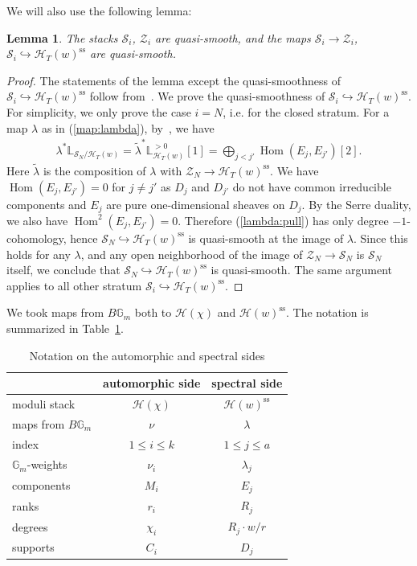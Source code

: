 \documentclass[11pt,oneside,a4paper,mathscr]{amsart}
\newtheorem{lemma}[thm]{Lemma}
\theoremstyle{definition}
\renewcommand{\leq}{\leqslant}
\newcommand{\cS}{\mathcal{S}}
\newcommand{\cH}{\mathcal{H}}
\newcommand{\bgm}{B\mathbb{G}_m}
\newcommand{\Hom}{\operatorname{Hom}}
\begin{document}
We will also use the following lemma: 
\begin{lemma}\label{lem:SZqsm}
    The stacks $\cS_i$, $\mathcal{Z}_i$ are quasi-smooth, 
    and the maps $\cS_i \to \mathcal{Z}_i$, $\cS_i \hookrightarrow \cH_T(w)^{\mathrm{ss}}$ are quasi-smooth. 
\end{lemma}
\begin{proof}
    The statements of the lemma except the quasi-smoothness of $\cS_i \hookrightarrow \cH_T(w)^{\mathrm{ss}}$ follow from~\cite[Lemma~3.1.4]{HalpK32}.
    We prove the quasi-smoothness of $\cS_i \hookrightarrow \cH_T(w)^{\mathrm{ss}}$. For simplicity, we only prove the case $i=N$, i.e. for the closed stratum. 
    For a map $\lambda$ as in (\ref{map:lambda}), by~\cite[Lemma~1.3.2]{HalpK32}, we have 
    \begin{align}\label{lambda:pull}
        \lambda^* \mathbb{L}_{\cS_N/\cH_T(w)}=\widetilde{\lambda}^* \mathbb{L}_{\cH_T(w)}^{>0}[1]=  \bigoplus_{j<j'}\Hom(E_j, E_{j'})[2].
    \end{align}
    Here $\widetilde{\lambda}$ is the composition of $\lambda$ with 
    $\mathcal{Z}_N \to \cH_T(w)^{\mathrm{ss}}$. 
   We have $\Hom(E_j, E_{j'})=0$ for $j\neq j'$
   as $D_j$ and $D_{j'}$ do not have common 
   irreducible components and $E_j$ are pure one-dimensional sheaves on $D_j$. 
   By the Serre duality, we also have $\Hom^2(E_j, E_{j'})=0$. 
   Therefore (\ref{lambda:pull}) has only degree $-1$-cohomology, hence 
   $\cS_N \hookrightarrow \cH_T(w)^{\mathrm{ss}}$ is quasi-smooth
   at the image of $\lambda$. Since this holds for any $\lambda$, and 
   any open neighborhood of the image of $\mathcal{Z}_N \to \cS_N$ is 
   $\cS_N$ itself, we conclude that $\cS_N \hookrightarrow \cH_T(w)^{\mathrm{ss}}$ is quasi-smooth. The same argument applies 
   to all other stratum $\cS_i \hookrightarrow \cH_T(w)^{\mathrm{ss}}$. 
\end{proof}

We took maps from $\bgm$ both to $\cH(\chi)$ and $\cH(w)^{\mathrm{ss}}$. The notation
is summarized in Table~\ref{tab:notation}. 
\begin{table}[t]
\centering
\caption{Notation on the automorphic and spectral sides}
\label{tab:notation}
\begin{tabular}{l|c|c}
 & automorphic side & spectral side
 \\
\hline
moduli stack 
& $\mathcal{H}(\chi)$
& $\mathcal{H}(w)^{\mathrm{ss}}$
 \\
maps from $\bgm$
& $\nu$
& $\lambda$
 \\
 index
& $1\leq i\leq k$
& $1\leq j\leq a$
 \\
$\mathbb{G}_m$-weights
& $\nu_i$
& $\lambda_j$
 \\
components
& $M_i$
& $E_j$
 \\
ranks
& $r_i$
& $R_j$
 \\
degrees
& $\chi_i$
& $R_j \cdot w/r$
 \\
supports
& $C_i$
& $D_j$
\end{tabular}
\end{table}
\end{document}
